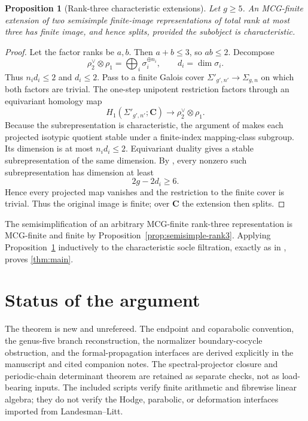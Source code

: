 \documentclass[11pt]{article}
\newtheorem{proposition}[theorem]{Proposition}
\theoremstyle{definition}
\newcommand{\C}{\mathbf C}
\begin{document}
\begin{proposition}[Rank-three characteristic extensions]
\label{prop:rank3-socle}
Let $g\ge5$.  An MCG-finite extension of two semisimple finite-image
representations of total rank at most three has finite image, and hence
splits, provided the subobject is characteristic.
\end{proposition}

\begin{proof}
Let the factor ranks be $a,b$.  Then $a+b\le3$, so $ab\le2$.  Decompose
\[
 \rho_2^\vee\otimes\rho_1
 =\bigoplus_i\sigma_i^{\oplus n_i},
 \qquad d_i=\dim\sigma_i.
\]
Thus $n_id_i\le2$ and $d_i\le2$.  Pass to a finite Galois cover
$\Sigma'_{g',n'}\to\Sigma_{g,n}$ on which both factors are trivial.  The
one-step unipotent restriction factors through
an equivariant homology map
\[
 H_1(\Sigma'_{g',n'};\C)\longrightarrow
 \rho_2^\vee\otimes\rho_1.
\]
Because the subrepresentation is characteristic, the argument of
\cite[Lemma 8.6.1]{LLCan} makes each projected isotypic quotient stable under
a finite-index mapping-class subgroup.  Its dimension is at most
$n_id_i\le2$.  Equivariant duality gives a stable subrepresentation of the
same dimension.  By \cite[Theorem 7.2.1]{LLCan}, every nonzero such
subrepresentation has dimension at least
\[
 2g-2d_i\ge6.
\]
Hence every projected map vanishes and the restriction to the finite cover
is trivial.  Thus the original image is finite; over $\C$ the extension
then splits.
\end{proof}

The semisimplification of an arbitrary MCG-finite rank-three representation
is MCG-finite and finite by Proposition~\ref{prop:semisimple-rank3}.
Applying Proposition~\ref{prop:rank3-socle} inductively to the characteristic
socle filtration, exactly as in \cite[Section 8.7]{LLCan}, proves
\cref{thm:main}.

\section*{Status of the argument}

The theorem is new and unrefereed.  The endpoint and coparabolic convention,
the genus-five branch reconstruction, the normalizer boundary-cocycle
obstruction, and the formal-propagation interfaces are derived explicitly in
the manuscript and cited companion notes.  The spectral-projector closure
and periodic-chain determinant theorem are retained as separate checks,
not as load-bearing inputs.  The included scripts verify finite arithmetic
and fibrewise linear algebra; they do not verify the Hodge, parabolic, or
deformation interfaces imported from Landesman--Litt.
\end{document}
